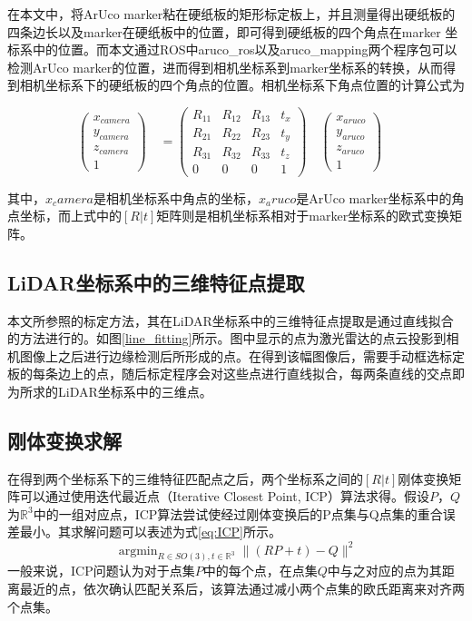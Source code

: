 在本文中，将ArUco marker粘在硬纸板的矩形标定板上，并且测量得出硬纸板的四条边长以及marker在硬纸板中的位置，即可得到硬纸板的四个角点在marker 坐标系中的位置。而本文通过ROS中aruco\_ros以及aruco\_mapping两个程序包可以检测ArUco marker的位置，进而得到相机坐标系到marker坐标系的转换，从而得到相机坐标系下的硬纸板的四个角点的位置。相机坐标系下角点位置的计算公式为

$$\begin{pmatrix} x_{camera}\\y_{camera}\\z_{camera}\\ 1 \end{pmatrix}\quad = \begin{pmatrix} R_{11}&R_{12}&R_{13}&t_x\\R_{21}&R_{22}&R_{23}&t_y\\R_{31}&R_{32}&R_{33}&t_z\\ 0&0&0&1 \end{pmatrix}\quad \begin{pmatrix} x_{aruco}\\y_{aruco}\\z_{aruco}\\ 1 \end{pmatrix}\quad$$
    
其中，$x_camera$是相机坐标系中角点的坐标，$x_aruco$是ArUco marker坐标系中的角点坐标，而上式中的$[R|t]$矩阵则是相机坐标系相对于marker坐标系的欧式变换矩阵。

\subsection{LiDAR坐标系中的三维特征点提取}

本文所参照的标定方法，其在LiDAR坐标系中的三维特征点提取是通过直线拟合的方法进行的。如图\ref{line_fitting}所示。图中显示的点为激光雷达的点云投影到相机图像上之后进行边缘检测后所形成的点。在得到该幅图像后，需要手动框选标定板的每条边上的点，随后标定程序会对这些点进行直线拟合，每两条直线的交点即为所求的LiDAR坐标系中的三维点。

\subsection{刚体变换求解}

在得到两个坐标系下的三维特征匹配点之后，两个坐标系之间的$[R|t]$刚体变换矩阵可以通过使用迭代最近点（Iterative Closest Point, ICP）算法求得。假设$P$，$Q$为$\mathbb{R}^3$中的一组对应点，ICP算法尝试使经过刚体变换后的P点集与Q点集的重合误差最小。其求解问题可以表述为式\ref{eq:ICP}所示。
\begin{equation}
    \mathop{\arg\min}_{R\in SO(3), t\in \mathbb{R}^3}  \| (RP+t)-Q \|^2 
    \label{eq:ICP}
\end{equation}
一般来说，ICP问题认为对于点集$P$中的每个点，在点集$Q$中与之对应的点为其距离最近的点，依次确认匹配关系后，该算法通过减小两个点集的欧氏距离来对齐两个点集。

